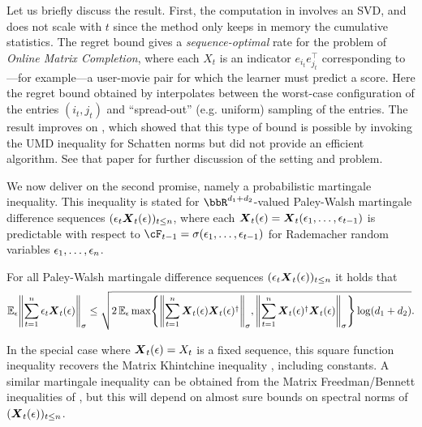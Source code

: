 	Let us briefly discuss the result. First, the computation in  involves an SVD, and does not scale with $t$ since the method only keeps in memory the cumulative statistics. The regret bound gives a \emph{sequence-optimal} rate for the problem of \emph{Online Matrix Completion}, where each $X_t$ is an indicator $e_{i_t}e_{j_t}^{\top}$ corresponding to---for example---a user-movie pair for which the learner must predict a score. Here the regret bound obtained by  interpolates between the worst-case configuration of the entries $(i_t,j_t)$ and ``spread-out'' (e.g. uniform) sampling of the entries. The result improves on \citep{foster2017zigzag}, which showed that this type of bound is possible by invoking the UMD inequality for Schatten norms but did not provide an efficient algorithm. See that paper for further discussion of the setting and problem.
	

  We now deliver on the second promise, namely a probabilistic martingale inequality. This inequality is stated for $\bbR^{d_1+d_2}$-valued Paley-Walsh martingale difference sequences $(\epsilon_t\boldsymbol{X}_t(\epsilon))_{t\leq{}n}$, where each $\boldsymbol{X}_{t}(\epsilon) = \boldsymbol{X}_{t}(\epsilon_1,\ldots,\epsilon_{t-1})$ is predictable with respect to $\cF_{t-1}=\sigma(\eps_{1},\ldots,\eps_{t-1})$ for Rademacher random variables $\epsilon_{1},\ldots,\epsilon_{n}$.

  \begin{corollary}
    \label{corr:matrix_square}
    For all Paley-Walsh martingale difference sequences $(\epsilon_t\boldsymbol{X}_{t}(\epsilon))_{t\leq{}n}$ it holds that
    \begin{equation}
      \label{eq:matrix_square}
    \En_{\eps}\nrm*{\sum_{t=1}^{n}\eps_t\mb{X}_{t}(\eps)}_{\sigma}
    \leq{} \sqrt{2\En_{\eps}\max\crl*{\nrm*{\sum_{t=1}^{n}\mb{X}_{t}(\eps)\mb{X}_{t}(\eps)^{\trn}}_{\sigma}, \nrm*{\sum_{t=1}^{n}\mb{X}_{t}(\eps)^{\trn}\mb{X}_{t}(\eps)}_{\sigma}}\log(d_1+d_2)}.
    \end{equation}
  \end{corollary}
    In the special case where $\boldsymbol{X}_t(\epsilon)=X_t$ is a fixed sequence, this square function inequality  recovers the Matrix Khintchine inequality \citep{mackey2014matrix}, including constants.  A similar martingale inequality can be obtained from the Matrix Freedman/Bennett inequalities of \cite{tropp2011freedman}, but this will depend on almost sure bounds on spectral norms of $(\boldsymbol{X}_{t}(\epsilon))_{t\leq{}n}$.

